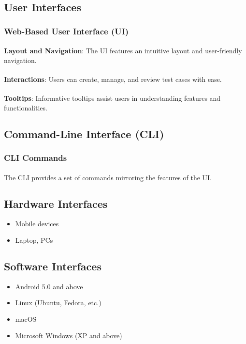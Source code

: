 \documentclass{article}
\begin{document}
\subsection{User Interfaces}
\subsubsection{Web-Based User Interface (UI)}
\paragraph{}
\textbf{Layout and Navigation}: The UI features an intuitive layout and user-friendly navigation.
\vspace{-0.4cm}
\paragraph{}
\textbf{Interactions}: Users can create, manage, and review test cases with ease.
\vspace{-0.4cm}
\paragraph{}
\textbf{Tooltips}: Informative tooltips assist users in understanding features and functionalities.

\subsection{Command-Line Interface (CLI)}
\subsubsection{CLI Commands}
\paragraph{}
The CLI provides a set of commands mirroring the features of the UI.

\subsection{Hardware Interfaces}
\begin{itemize}
    \item Mobile devices
    \item Laptop, PCs
\end{itemize}

\subsection{Software Interfaces}
\begin{itemize}
    \item Android 5.0 and above
    \item Linux (Ubuntu, Fedora, etc.)
    \item macOS
    \item Microsoft Windows (XP and above)
\end{itemize}
\end{document}
